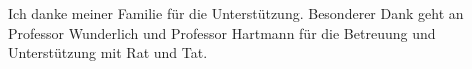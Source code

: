 \cleardoublepage


\begin{acknowledgements}

Ich danke meiner Familie für die Unterstützung. 
Besonderer Dank geht an Professor Wunderlich und Professor Hartmann für die Betreuung und Unterstützung mit Rat und Tat.
 

\end{acknowledgements}